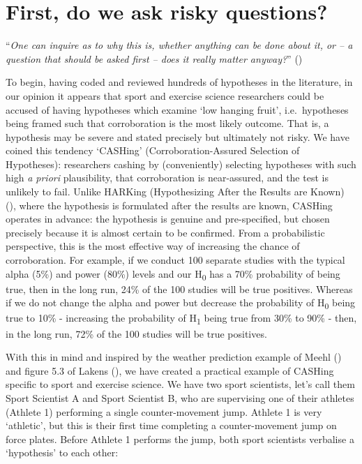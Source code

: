 \documentclass[
]{article}
\begin{document}
\section{First, do we ask risky
questions?}\label{first-do-we-ask-risky-questions}

``\emph{One can inquire as to why this is, whether anything can be done
about it, or -- a question that should be asked first -- does it really
matter anyway?}'' ()

To begin, having coded and reviewed hundreds of hypotheses in the
literature, in our opinion it appears that sport and exercise science
researchers could be accused of having hypotheses which examine `low
hanging fruit', i.e.~hypotheses being framed such that corroboration is
the most likely outcome. That is, a hypothesis may be severe and stated
precisely but ultimately not risky. We have coined this tendency
`CASHing' (Corroboration-Assured Selection of Hypotheses): researchers
cashing by (conveniently) selecting hypotheses with such high \emph{a
priori} plausibility, that corroboration is near-assured, and the test
is unlikely to fail. Unlike HARKing (Hypothesizing After the Results are
Known) (), where the hypothesis is
formulated after the results are known, CASHing operates in advance: the
hypothesis is genuine and pre-specified, but chosen precisely because it
is almost certain to be confirmed. From a probabilistic perspective,
this is the most effective way of increasing the chance of
corroboration. For example, if we conduct 100 separate studies with the
typical alpha (5\%) and power (80\%) levels and our H\textsubscript{0}
has a 70\% probability of being true, then in the long run, 24\% of the
100 studies will be true positives. Whereas if we do not change the
alpha and power but decrease the probability of H\textsubscript{0} being
true to 10\% - increasing the probability of H\textsubscript{1} being
true from 30\% to 90\% - then, in the long run, 72\% of the 100 studies
will be true positives.

With this in mind and inspired by the weather prediction example of
Meehl () and figure
5.3 of Lakens (), we have created a practical example of CASHing specific to
sport and exercise science. We have two sport scientists, let's call
them Sport Scientist A and Sport Scientist B, who are supervising one of
their athletes (Athlete 1) performing a single counter-movement jump.
Athlete 1 is very `athletic', but this is their first time completing a
counter-movement jump on force plates. Before Athlete 1 performs the
jump, both sport scientists verbalise a `hypothesis' to each other:
\end{document}
